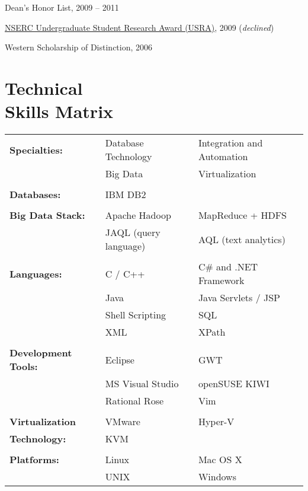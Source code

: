 \documentclass[margin,line]{resume}
\begin{document}
\begin{resume}
\begin{list2}
	\item Dean's Honor List, 2009 -- 2011
	\item \href{http://www.uwo.ca/research/funding/internal/nserc_usra.html}{NSERC Undergraduate Student Research Award (USRA)}, 2009	\hfill(\textsl{declined})
	\item Western Scholarship of Distinction, 2006 
\end{list2}


\newpage


\section{\mysidestyle Technical\\Skills Matrix} 

\begin{tabular}{@{}p{1.75in}p{1.75in}p{1.75in}}

\textbf{Specialties:}		&	Database Technology	&	Integration and Automation	\\
				&	Big Data		&	Virtualization			\\
\\
\textbf{Databases:}		&	IBM DB2			&					\\
\\
\textbf{Big Data Stack:}	&	Apache Hadoop		&	MapReduce + HDFS		\\
				&	JAQL (query language)	&	AQL (text analytics)		\\
\\
\textbf{Languages:}		&	C / C++			&	C\# and .NET Framework		\\
				&	Java			&	Java Servlets / JSP		\\
				&	Shell Scripting		&	SQL				\\
				&	XML			&	XPath				\\
\\
\textbf{Development Tools:}	&	Eclipse			&	GWT				\\
				&	MS Visual Studio	&	openSUSE KIWI			\\
				&	Rational Rose		&	Vim				\\
\\
\textbf{Virtualization }	&	VMware			&	Hyper-V				\\
\textbf{Technology:}		&	KVM			&					\\
\\
\textbf{Platforms:}		&	Linux			&	Mac OS X			\\
				&	UNIX			&	Windows				\\


\end{tabular}
\end{resume}
\end{document}
